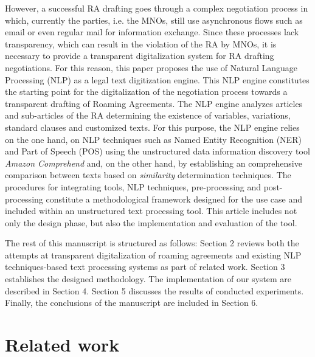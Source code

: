 \documentclass[conference]{style/IEEEtran}
\begin{document}
However, a successful RA drafting goes through a complex negotiation process in which, currently the parties, i.e. the MNOs, still use asynchronous flows such as email or even regular mail for information exchange. Since these processes lack transparency, which can result in the violation of the RA by MNOs, it is necessary to provide a transparent digitalization system for RA drafting negotiations. For this reason, this paper proposes the use of Natural Language Processing (NLP) as a legal text digitization engine. This NLP engine constitutes the starting point for the digitalization of the negotiation process towards a transparent drafting of Roaming Agreements. The NLP engine analyzes articles and sub-articles of the RA determining the existence of variables, variations, standard clauses and customized texts. For this purpose, the NLP engine relies on the one hand, on NLP techniques such as Named Entity Recognition (NER) and Part of Speech (POS) using the unstructured data information discovery tool \textit{Amazon Comprehend} and, on the other hand, by establishing an comprehensive comparison between texts based on \textit{similarity} determination techniques. The procedures for integrating tools, NLP techniques, pre-processing and post-processing constitute a methodological framework designed for the use case and included within an unstructured text processing tool. This article includes not only the design phase, but also the implementation and evaluation of the tool.

The rest of this manuscript is structured as follows: Section 2 reviews both the attempts at transparent digitalization of roaming agreements and existing NLP techniques-based text processing systems as part of related work. Section 3 establishes the designed methodology. The implementation of our system are described in Section 4. Section 5 discusses the results of conducted experiments. Finally, the conclusions of the manuscript are included in Section 6.

\section{Related work}
\end{document}
